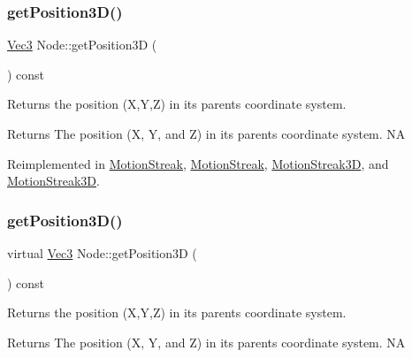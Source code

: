 \subsubsection{\texorpdfstring{get\+Position3\+D()}{getPosition3D()}\hspace{0.1cm}{\footnotesize\ttfamily [1/2]}}
{\footnotesize\ttfamily \hyperlink{classVec3}{Vec3} Node\+::get\+Position3D (\begin{DoxyParamCaption}{ }\end{DoxyParamCaption}) const\hspace{0.3cm}{\ttfamily [virtual]}}

Returns the position (X,Y,Z) in its parent\textquotesingle{}s coordinate system.

\begin{DoxyReturn}{Returns}
The position (X, Y, and Z) in its parent\textquotesingle{}s coordinate system.  NA 
\end{DoxyReturn}


Reimplemented in \hyperlink{classMotionStreak_ab07adb87a9770b5bbafa2fff999515f6}{Motion\+Streak}, \hyperlink{classMotionStreak_afa9dc064ec1140bf1e14e526221d5b72}{Motion\+Streak}, \hyperlink{classMotionStreak3D_ab2c89d13a16dc7ee2e8f2408a1f5afbb}{Motion\+Streak3D}, and \hyperlink{classMotionStreak3D_a60ec5113c30e2b81c15b43595a98ce63}{Motion\+Streak3D}.

\mbox{\label{classNode_a7c3cc76f19c34ce2d4edd48bece7731b}} 
\subsubsection{\texorpdfstring{get\+Position3\+D()}{getPosition3D()}\hspace{0.1cm}{\footnotesize\ttfamily [2/2]}}
{\footnotesize\ttfamily virtual \hyperlink{classVec3}{Vec3} Node\+::get\+Position3D (\begin{DoxyParamCaption}{ }\end{DoxyParamCaption}) const\hspace{0.3cm}{\ttfamily [virtual]}}

Returns the position (X,Y,Z) in its parent\textquotesingle{}s coordinate system.

\begin{DoxyReturn}{Returns}
The position (X, Y, and Z) in its parent\textquotesingle{}s coordinate system.  NA 
\end{DoxyReturn}



